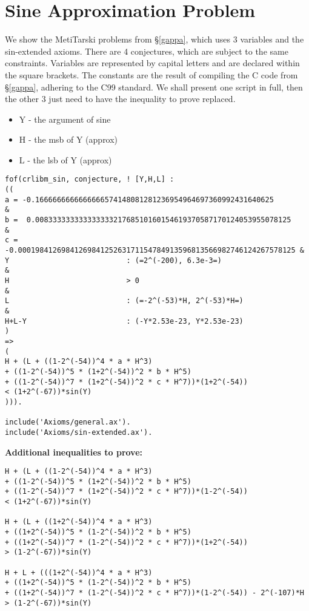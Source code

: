 \documentclass{fac}
\begin{document}
\section{Sine Approximation Problem} \label{sine_appendix}
We show the MetiTarski problems from \S \ref{gappa}, which uses 3 variables and the sin-extended axioms. There are 4 conjectures, which are subject to the same constraints. Variables are represented by capital letters and are declared within the square brackets. The constants are the result of compiling the C code from \S \ref{gappa}, adhering to the C99 standard. We shall present one script in full, then the other 3 just need to have the inequality to prove replaced. 
\begin{itemize}
    \item Y - the argument of sine
    \item H - the msb of Y (approx)
    \item L - the lsb of Y (approx)
\end{itemize}

\begin{lstlisting}
fof(crlibm_sin, conjecture, ! [Y,H,L] : 
((
a = -0.1666666666666666574148081281236954964697360992431640625          &
b =  0.00833333333333333321768510160154619370587170124053955078125      &
c = -0.0001984126984126984125263171154784913596813566982746124267578125 &
Y                           : (=2^(-200), 6.3e-3=)                      &  
H                           > 0                                         &
L                           : (=-2^(-53)*H, 2^(-53)*H=)                 &
H+L-Y                       : (-Y*2.53e-23, Y*2.53e-23)                 
) 
=>
( 
H + (L + ((1-2^(-54))^4 * a * H^3) 
+ ((1-2^(-54))^5 * (1+2^(-54))^2 * b * H^5) 
+ ((1-2^(-54))^7 * (1+2^(-54))^2 * c * H^7))*(1+2^(-54)) 
< (1+2^(-67))*sin(Y)    
))).

include('Axioms/general.ax').
include('Axioms/sin-extended.ax').
\end{lstlisting}


\noindent\textbf{Additional inequalities to prove:}
\begin{lstlisting}
H + (L + ((1-2^(-54))^4 * a * H^3) 
+ ((1-2^(-54))^5 * (1+2^(-54))^2 * b * H^5) 
+ ((1-2^(-54))^7 * (1+2^(-54))^2 * c * H^7))*(1-2^(-54)) 
< (1+2^(-67))*sin(Y)    

H + (L + ((1+2^(-54))^4 * a * H^3) 
+ ((1+2^(-54))^5 * (1-2^(-54))^2 * b * H^5) 
+ ((1+2^(-54))^7 * (1-2^(-54))^2 * c * H^7))*(1+2^(-54)) 
> (1-2^(-67))*sin(Y) 

H + L + (((1+2^(-54))^4 * a * H^3) 
+ ((1+2^(-54))^5 * (1-2^(-54))^2 * b * H^5) 
+ ((1+2^(-54))^7 * (1-2^(-54))^2 * c * H^7))*(1-2^(-54)) - 2^(-107)*H 
> (1-2^(-67))*sin(Y) 
\end{lstlisting}
\end{document}
